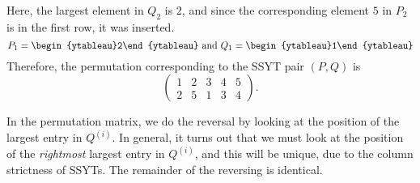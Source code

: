 \begin{fex}
		Here, the largest element in $Q_2$ is $2$, and since the corresponding element $5$ in $P_2$ is in the first row, it was inserted.
		\[ P_1 = \begin{ytableau}2\end{ytableau} \text{ and } Q_1 = \begin{ytableau}1\end{ytableau} \]
		Therefore, the permutation corresponding to the SSYT pair $(P,Q)$ is
		\[
		\begin{pmatrix}
			1 & 2 & 3 & 4 & 5 \\
			2 & 5 & 1 & 3 & 4
		\end{pmatrix}.
		\]
	\end{fex}

	In the permutation matrix, we do the reversal by looking at the position of the largest entry in $Q^{(i)}$. In general, it turns out that we must look at the position of the \emph{rightmost} largest entry in $Q^{(i)}$, and this will be unique, due to the column strictness of SSYTs. The remainder of the reversing is identical.
	
